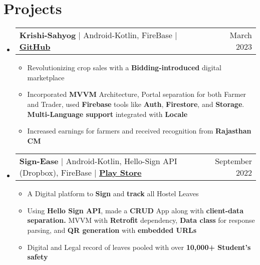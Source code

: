 \documentclass[letterpaper,11pt]{article}
\makeatletter
\newcommand{\resumeItem}[1]{
  \item\small{
    {#1 \vspace{-2pt}}
  }
}
\newcommand{\resumeProjectHeading}[2]{
    \item
    \begin{tabular*}{0.97\textwidth}{l@{\extracolsep{\fill}}r}
      \small#1 & #2 \\
    \end{tabular*}\vspace{-7pt}
}
\newcommand{\resumeSubHeadingListStart}{\begin{itemize}[leftmargin=0.15in, label={}]}
\newcommand{\resumeSubHeadingListEnd}{\end{itemize}}
\newcommand{\resumeItemListStart}{\begin{itemize}}
\newcommand{\resumeItemListEnd}{\end{itemize}\vspace{-5pt}}
\makeatother
\begin{document}
\section{\textbf{Projects}}
\resumeSubHeadingListStart
      \resumeProjectHeading
          {\textbf{Krishi-Sahyog } $|$ {Android-Kotlin, FireBase} $|$ \textbf{\href{https://github.com/aniketk13/FarmApp}{GitHub}}}{March 2023}
          \resumeItemListStart
          \resumeItem{Revolutionizing crop sales with a \textbf{Bidding-introduced} digital marketplace}
          \resumeItem{Incorporated \textbf{MVVM} Architecture, Portal separation for both Farmer and Trader, used \textbf{Firebase} tools like \textbf{Auth}, \textbf{Firestore}, and \textbf{Storage}. \textbf{Multi-Language support} integrated with \textbf{Locale}}
          \resumeItem{Increased earnings for farmers and received recognition from \textbf{Rajasthan CM}}
          \resumeItemListEnd
    \resumeSubHeadingListEnd
 \resumeSubHeadingListStart
      \resumeProjectHeading
          {\textbf{Sign-Ease } $|${ Android-Kotlin, Hello-Sign API (Dropbox), FireBase} $|$ \textbf{\href{https://play.google.com/store/apps/details?id=com.teamdefine.signease}{Play Store}} }{September 2022}
          \resumeItemListStart
          \resumeItem{A Digital platform to \textbf{Sign} and \textbf{track} all Hostel Leaves}
          \resumeItem{Using \textbf{Hello Sign API}, made a \textbf{CRUD} App along with \textbf{client-data separation.} MVVM with \textbf{Retrofit} dependency, \textbf{Data class} for response parsing, and \textbf{QR generation} with \textbf{embedded URLs}}
          \resumeItem{Digital and Legal record of leaves pooled with over \textbf{10,000+ Student's safety}}
          \resumeItemListEnd
    \resumeSubHeadingListEnd
    
    
\end{document}
